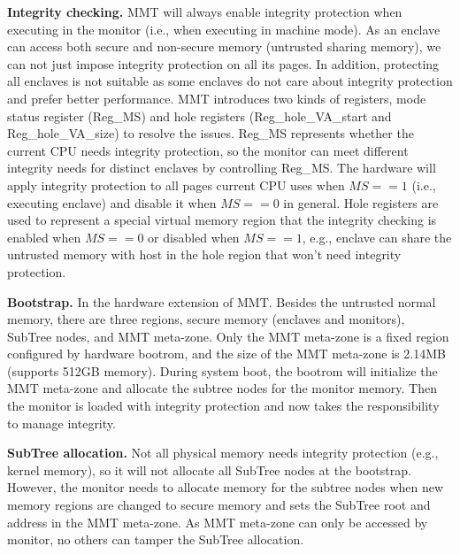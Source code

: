 \begin{bigabstract}
  \textbf{Integrity checking.} MMT will always enable integrity
  protection when executing in the monitor (i.e., when executing in machine mode). As an enclave can access both
  secure and non-secure memory (untrusted sharing memory),
  we can not just impose integrity protection on all its pages.
  In addition, protecting all enclaves is not suitable as some
  enclaves do not care about integrity protection and prefer
  better performance. MMT introduces two kinds of
  registers, mode status register (Reg\_MS) and hole registers
  (Reg\_hole\_VA\_start and Reg\_hole\_VA\_size) to resolve the
  issues. Reg\_MS represents whether the current CPU needs integrity protection, so the monitor can meet different integrity
  needs for distinct enclaves by controlling Reg\_MS. The hardware will apply integrity protection to all pages current CPU
  uses when $MS== 1$ (i.e., executing enclave) and disable it
  when $MS== 0$ in general. Hole registers are used to represent
  a special virtual memory region that the integrity checking
  is enabled when $MS== 0$ or disabled when $MS== 1$, e.g.,
  enclave can share the untrusted memory with host in the hole
  region that won't need integrity protection.

  \textbf{Bootstrap.} In the hardware extension of
  MMT. Besides the untrusted normal memory, there are three
  regions, secure memory (enclaves and monitors), SubTree
  nodes, and MMT meta-zone. Only the MMT meta-zone is a
  fixed region configured by hardware bootrom, and the size of
  the MMT meta-zone is 2.14MB (supports 512GB memory).
  During system boot, the bootrom will initialize the MMT
  meta-zone and allocate the subtree nodes for the monitor
  memory. Then the monitor is loaded with integrity protection
  and now takes the responsibility to manage integrity.

  \textbf{SubTree allocation.} Not all physical memory needs integrity
  protection (e.g., kernel memory), so it will not allocate all
  SubTree nodes at the bootstrap. However, the monitor needs
  to allocate memory for the subtree nodes when new memory
  regions are changed to secure memory and sets the SubTree
  root and address in the MMT meta-zone. As MMT meta-zone
  can only be accessed by monitor, no others can tamper the
  SubTree allocation.


\end{bigabstract}
